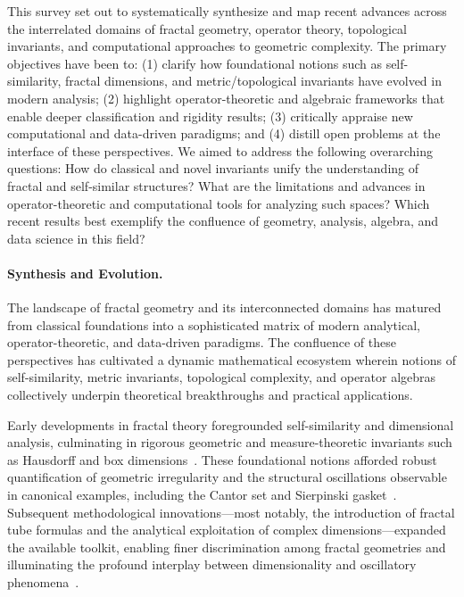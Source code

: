 \documentclass[sigconf]{acmart}
\begin{document}
This survey set out to systematically synthesize and map recent advances across the interrelated domains of fractal geometry, operator theory, topological invariants, and computational approaches to geometric complexity. The primary objectives have been to: (1) clarify how foundational notions such as self-similarity, fractal dimensions, and metric/topological invariants have evolved in modern analysis; (2) highlight operator-theoretic and algebraic frameworks that enable deeper classification and rigidity results; (3) critically appraise new computational and data-driven paradigms; and (4) distill open problems at the interface of these perspectives. We aimed to address the following overarching questions: How do classical and novel invariants unify the understanding of fractal and self-similar structures? What are the limitations and advances in operator-theoretic and computational tools for analyzing such spaces? Which recent results best exemplify the confluence of geometry, analysis, algebra, and data science in this field?

\paragraph{Synthesis and Evolution.} 

The landscape of fractal geometry and its interconnected domains has matured from classical foundations into a sophisticated matrix of modern analytical, operator-theoretic, and data-driven paradigms. The confluence of these perspectives has cultivated a dynamic mathematical ecosystem wherein notions of self-similarity, metric invariants, topological complexity, and operator algebras collectively underpin theoretical breakthroughs and practical applications.

Early developments in fractal theory foregrounded self-similarity and dimensional analysis, culminating in rigorous geometric and measure-theoretic invariants such as Hausdorff and box dimensions~\cite{ref2,ref36}. These foundational notions afforded robust quantification of geometric irregularity and the structural oscillations observable in canonical examples, including the Cantor set and Sierpinski gasket~\cite{ref3}. Subsequent methodological innovations---most notably, the introduction of fractal tube formulas and the analytical exploitation of complex dimensions---expanded the available toolkit, enabling finer discrimination among fractal geometries and illuminating the profound interplay between dimensionality and oscillatory phenomena~\cite{ref3,ref36}.
\end{document}
